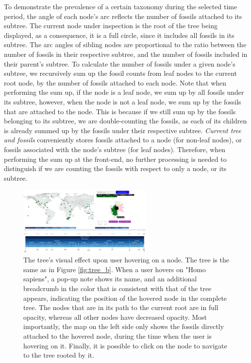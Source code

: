\documentclass[11pt, a4paper,oneside,chapterprefix=false]{scrbook}
\begin{document}
To demonstrate the prevalence of a certain taxonomy during the selected time period, the angle of each node's arc reflects the number of fossils attached to its subtree. The current node under inspection is the root of the tree being displayed, as a consequence, it is a full circle, since it includes all fossils in its subtree. The arc angles of sibling nodes are proportional to the ratio between the number of fossils in their respective subtree, and the number of fossils included in their parent's subtree. To calculate the number of fossils under a given node's subtree, we recursively sum up the fossil counts from leaf nodes to the current root node, by the number of fossils attached to each node. Note that when performing the sum up, if the node is a leaf node, we sum up by all fossils under its subtree, however, when the node is not a leaf node, we sum up by the fossils that are attached to the node. This is because if we still sum up by the fossils belonging to its subtree, we are double-counting the fossils, as each of its children is already summed up by the fossils under their respective subtree. \emph{Current tree and fossils} conveniently stores fossils attached to a node (for non-leaf nodes), or fossils associated with the node's subtree (for leaf nodes). Therefore, when performing the sum up at the front-end, no further processing is needed to distinguish if we are counting the fossils with respect to only a node, or its subtree. \\
\begin{figure}[h]
	\centering
	\includegraphics[width=0.6\textwidth]{figures/technical_solution/tree/tree_hover}
	\caption{The tree's visual effect upon user hovering on a node. The tree is the same as in Figure \ref{fig:tree_b}. When a user hovers on "Homo sapiens", a pop-up note shows its name, and an additional breadcrumb in the color that is consistent with that of the tree appears, indicating the position of the hovered node in the complete tree. The nodes that are in its path to the current root are in full opacity, whereas all other nodes have decreased opacity. Most importantly, the map on the left side only shows the fossils directly attached to the hovered node, during the time when the user is hovering on it. Finally, it is possible to click on the node to navigate to the tree rooted by it. }
	\label{fig:tree_hover}
\end{figure}
\end{document}
